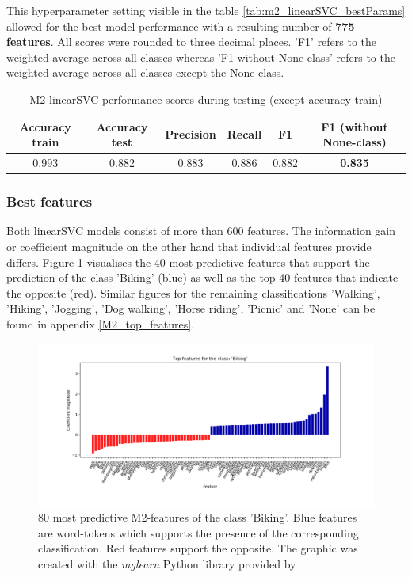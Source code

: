 This hyperparameter setting visible in the table \ref{tab:m2_linearSVC_bestParams} allowed for the best model performance with a resulting number of \textbf{775 features}. All scores were rounded to three decimal places. 'F1' refers to the weighted average across all classes whereas 'F1 without None-class' refers to the weighted average across all classes except the None-class.

\begin{table}[h!]
\begin{center}
\caption{M2 linearSVC performance scores during testing (except accuracy train)}\vspace{1ex}
\label{tab:m2_linearSVC_bestscores}
\begin{tabular}{cccccc}\hline
Accuracy train & Accuracy test & Precision & Recall & F1 & F1 (without None-class)\\ \hline
0.993 & 0.882 & 0.883 & 0.886 & 0.882 & \textbf{0.835} \\ \hline
\end{tabular}
\end{center}
\end{table}

\subsubsection*{Best features}
Both linearSVC models consist of more than 600 features. The information gain or coefficient magnitude on the other hand that individual features provide differs. Figure \ref{fig:M2_top40_features_biking} visualises the 40 most predictive features that support the prediction of the class 'Biking' (blue) as well as the top 40 features that indicate the opposite (red). Similar figures for the remaining classifications 'Walking', 'Hiking', 'Jogging', 'Dog walking', 'Horse riding', 'Picnic' and 'None' can be found in appendix \ref{M2_top_features}. 
\begin{figure}[h!]
   \centering
   \includegraphics[width=\textwidth]{img/m2_top_40_features_Biking_cropped.pdf}
   \caption{80 most predictive M2-features of the class 'Biking'. Blue features are word-tokens which supports the presence of the corresponding classification. Red features support the opposite. The graphic was created with the \textit{mglearn} Python library provided by \parencite{Guido2016}}
   \label{fig:M2_top40_features_biking}
\end{figure}

